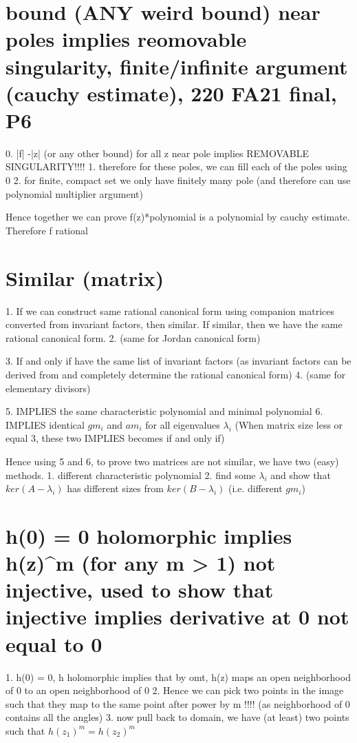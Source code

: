   

\section*{bound (ANY weird bound) near poles implies reomovable singularity, finite/infinite argument (cauchy estimate), 220 FA21 final, P6}
0. |f| -|z| (or any other bound) for all z near pole implies REMOVABLE SINGULARITY!!!!
1. therefore for these poles, we can fill each of the poles using 0
2. for finite, compact set we only have finitely many pole (and therefore can use polynomial multiplier argument)

Hence together we can prove f(z)*polynomial is a polynomial by cauchy estimate. Therefore f rational

\section*{Similar (matrix)}

1. If we can construct same rational canonical form using companion matrices converted from invariant factors, then similar. If similar, then we have the same rational canonical form.
2. (same for Jordan canonical form)

3. If and only if have the same list of invariant factors (as invariant factors can be derived from and completely determine the rational canonical form)
4. (same for elementary divisors)

5. IMPLIES the same characteristic polynomial and minimal polynomial
6. IMPLIES identical $gm_i$ and $am_i$ for all eigenvalues $\lambda_i$
(When matrix size less or equal 3, these two IMPLIES becomes if and only if)

Hence using 5 and 6, to prove two matrices are not similar, we have two (easy) methods.
	1. different characteristic polynomial
    2. find some $\lambda_i$ and show that $ker(A-\lambda_i)$ has different sizes from $ker(B-\lambda_i)$ (i.e. different $gm_i$)


\section*{h(0) = 0 holomorphic implies h(z)^m (for any m > 1) not injective, used to show that injective implies derivative at 0 not equal to 0}
    1. h(0) = 0, h holomorphic implies that
        by omt, h(z) maps an open neighborhood of 0 to an open neighborhood of 0
    2. Hence we can pick two points in the image such that they map to the same point after power by m 
        !!!! (as neighborhood of 0 contains all the angles)
    3. now pull back to domain, we have (at least) two points such that $h(z_1)^m = h(z_2)^m$





